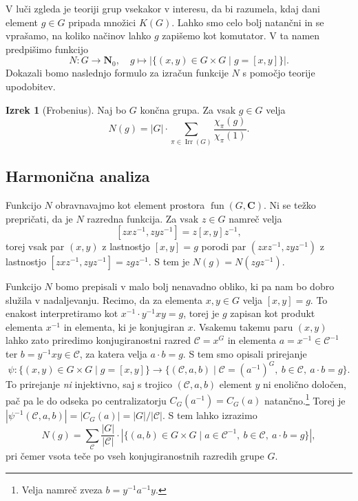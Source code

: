 \documentclass[11pt]{book}
\def\NN{\mathbf{N}}
\def\CC{\mathbf{C}}
\def\conclass{\mathcal{C}}
\DeclareMathOperator\Irr{Irr}
\DeclareMathOperator\fun{fun}
\theoremstyle{definition}
\theoremstyle{zgled}
\theoremstyle{zgledbrezstevilke}
\theoremstyle{odprtproblem}
\theoremstyle{domacanaloga}
\theoremstyle{izrek}
\newtheorem{izrek}[theorem]{Izrek}
\begin{document}
V luči zgleda je teoriji grup vsekakor v interesu, da bi razumela, kdaj dani element $g \in G$ pripada množici $K(G)$. Lahko smo celo bolj natančni in se vprašamo, na koliko načinov lahko $g$ zapišemo kot komutator. V ta namen predpišimo funkcijo
\[
    N \colon G \to \NN_0, \quad
    g \mapsto |\{ (x,y) \in G \times G \mid g = [x,y] \}|.
\]
Dokazali bomo naslednjo formulo za izračun funkcije $N$ s pomočjo teorije upodobitev.

\begin{izrek}[Frobenius]
Naj bo $G$ končna grupa. Za vsak $g \in G$ velja
\[
    N(g) = |G| \cdot \sum_{\pi \in \Irr(G)} \frac{\chi_{\pi}(g)}{\chi_{\pi}(1)}.
\]
\end{izrek}


\subsection{Harmonična analiza}

Funkcijo $N$ obravnavajmo kot element prostora $\fun(G,\CC)$. Ni se težko prepričati, da je $N$ razredna funkcija. Za vsak $z \in G$ namreč velja
\[
    [z x z^{-1}, z y z^{-1}] = z [x,y] z^{-1},
\]
torej vsak par $(x,y)$ z lastnostjo $[x,y] = g$ porodi par $(z x z^{-1}, z y z^{-1})$ z lastnostjo $[z x z^{-1}, z y z^{-1}] = z g z^{-1}$. S tem je $N(g) = N(z g z^{-1})$.

Funkcijo $N$ bomo prepisali v malo bolj nenavadno obliko, ki pa nam bo dobro služila v nadaljevanju. Recimo, da za elementa $x,y \in G$ velja $[x,y] = g$. To enakost interpretiramo kot $x^{-1} \cdot y^{-1} x y = g$, torej je $g$ zapisan kot produkt elementa $x^{-1}$ in elementa, ki je konjugiran $x$. Vsakemu takemu paru $(x,y)$ lahko zato priredimo konjugiranostni razred $\conclass = x^G$ in elementa $a = x^{-1} \in \conclass^{-1}$ ter $b = y^{-1} x y \in \conclass$, za katera velja $a \cdot b = g$. S tem smo opisali prirejanje
\[
    \psi \colon \{ (x,y) \in G \times G \mid g = [x,y] \} \to 
    \{ (\conclass, a, b) \mid \conclass = (a^{-1})^G, \ b \in \conclass,\ a \cdot b = g \}.
\]
To prirejanje \emph{ni} injektivno, saj s trojico $(\conclass,a,b)$ element $y$ ni enolično določen, pač pa le do odseka po centralizatorju $C_G(a^{-1}) = C_G(a)$ natančno.\footnote{Velja namreč zveza $b = y^{-1} a^{-1} y$.} Torej je $|\psi^{-1}(\conclass,a,b)| = |C_G(a)| = |G|/|\conclass|$. S tem lahko izrazimo
\[
    N(g) = \sum_{\conclass} \frac{|G|}{|\conclass|} \cdot |\{ (a,b) \in G \times G \mid a \in \conclass^{-1}, \ b \in \conclass, \ a \cdot b = g \}|,
\]
pri čemer vsota teče po vseh konjugiranostnih razredih grupe $G$. 
\end{document}
